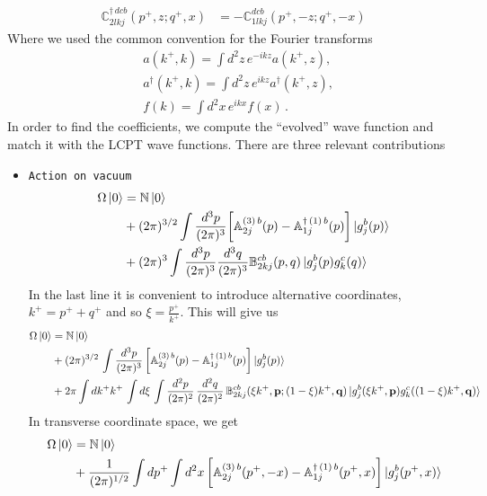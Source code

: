 \documentclass[10pt]{article}
\def\mf#1{\mathbb{#1}}
\def\v#1{\mathbf{#1}}
\numberwithin{equation}{section}
\begin{document}
\begin{align}
     \mf{C}^{\dagger\, dcb}_{2lkj}(p^{+},z; q^{+},x) & =  -\mf{C}^{dcb}_{1lkj}(p^{+}, -z; q^{+}, -x)
\end{align}
Where we used the common  convention for the Fourier transforms 
\begin{align}
    &a(k^+, k) = \int d^2z\, e^{-i k z} a(k^+,z), \\ 
    &a^\dagger(k^+, k) = \int d^2z\, e^{i k z} a^\dagger(k^+, z), \\ 
    & f (k) = \int d^2x\, e^{ikx} f(x)\,.
\end{align}
In order to find the coefficients, we compute the ``evolved'' wave function and match it with the LCPT wave functions. There are three relevant contributions 
\begin{itemize}
\item{\texttt{Action on vacuum}} 
\begin{align} \label{Omegaonvacmom1}
    \Omega\ket{0} & = \mf{N}\ket{0} \notag \\ &
    +(2\pi)^{3/2}\int \frac{d^3p}{(2\pi)^3}\bigg[\mf{A}^{(3)\, b}_{2j}(p)
    -\mf{A}^{\dagger\, (1)\, b}_{1j}(p)\bigg]\ket{g^{b}_{j}(p)} \notag \\ & 
    +(2\pi)^{3}\int \frac{d^3p}{(2\pi)^3} \frac{d^3q}{(2\pi)^3}  \mf{B}^{cb}_{2kj}(p,q)\ket{g^{b}_{j}(p)g^{c}_{k}(q)}
\end{align} 
In the last line it is convenient to introduce alternative coordinates, $k^+  = p^+ + q^+$ and so  $\xi = \frac{p^+}{k^+}$. This will give us 
\begin{align} \label{Omegaonvacmomzeta}
    \Omega\ket{0} & = \mf{N}\ket{0} \notag \\ &
    + (2\pi)^{3/2}\,\int \frac{d^3p}{(2\pi)^3}\,
    \bigg[\mf{A}^{(3)\, b}_{2j}(p)
    -\mf{A}^{\dagger\,(1)\, b}_{1j}(p)\bigg]\ket{g^{b}_{j}(p)} \notag \\ &
    + 2\pi \int dk^+ k^+ \,\int d \xi\,  \int \frac{d^2p}{(2\pi)^2}\, \frac{d^2q}{(2\pi)^2}\,  \mf{B}^{cb}_{2kj}(\xi k^+, \v p;  (1-\xi) k^+, \v q) \ket{g^{b}_{j}(\xi k^+, \v p)g^{c}_{k}((1-\xi) k^+, \v q)}
\end{align} 
In transverse coordinate space, we get 
\begin{align} \label{Omegaonvacpos}
    \Omega\ket{0} & = \mf{N}\ket{0} \notag \\ &
    + \frac{1}{(2\pi)^{1/2}}\int dp^{+} \int d^{2}x\,
   \bigg[\mf{A}^{(3)\, b}_{2j}(p^{+}, - x)
   -\mf{A}^{\dagger\,(1)\, b}_{1j}(p^{+},x)\bigg]\ket{g^{b}_{j}(p^{+},x)} \notag \\ & 

\end{align}
\end{itemize}
\end{document}
